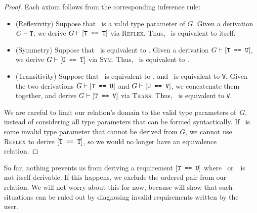 \documentclass[../generics]{subfiles}
\begin{document}
\begin{proof}
Each axiom follows from the corresponding inference rule:
\begin{itemize}
\item
(Reflexivity) Suppose that \tT\ is a valid type parameter of $G$. Given a derivation $G\vdash\texttt{T}$, we derive $G\vdash[\texttt{T == T}]$ via \textsc{Reflex}. Thus, \tT\ is equivalent to itself.
\item
(Symmetry) Suppose that \tT\ is equivalent to \tU. Given a derivation $G\vdash[\texttt{T == U}]$, we derive $G\vdash[\texttt{U == T}]$ via \textsc{Sym}. Thus, \tU\ is equivalent to \tT.
\item
(Transitivity) Suppose that \tT\ is equivalent to \tU, and \tU\ is equivalent to \texttt{V}. Given the two derivations $G\vdash[\texttt{T == U}]$ and $G\vdash[\texttt{U == V}]$, we concatenate them together, and derive $G\vdash[\texttt{T == V}]$ via \textsc{Trans}. Thus, \tT\ is equivalent to \texttt{V}.
\end{itemize}

We are careful to limit our relation's domain to the valid type parameters of~$G$, instead of considering all type parameters that can be formed syntactically. If \tT\ is some invalid type parameter that cannot be derived from $G$, we cannot use \textsc{Reflex} to derive $[\texttt{T == T}]$, so we would no longer have an equivalence relation.
\end{proof}

So far, nothing prevents us from deriving a requirement $[\texttt{T == U}]$ where \tT~or~\tU\ is not itself derivable. If this happens, we exclude the ordered pair from our relation. We will not worry about this for now, because  will show that such situations can be ruled out by diagnosing invalid requirements written by the user.
\end{document}
